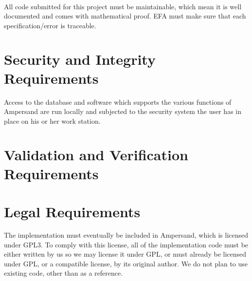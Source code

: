 \paragraph*{}
All code submitted for this project must be maintainable, which mean it is well 
documented and comes with mathematical proof. EFA must make sure that each 
specification/error is traceable.
  

\section{Security and Integrity Requirements}\label{sec:Security}
\paragraph*{}
 Access to the database and software which 
supports the various functions of Ampersand are run locally and subjected to the security system 
the user has in place on his or her work station.

	
\section{Validation and Verification Requirements}\label{sec:Verification}
\paragraph*{}

\section{Legal Requirements}\label{sec:Legal}
The implementation must eventually be included in Ampersand, which is licensed
under GPL3. To comply with this license, all of the implementation code must be
either written by us so we may license it under GPL, or must already be licensed
under GPL, or a compatible license, by its original author. We do not plan to
use existing code, other than as a reference.

